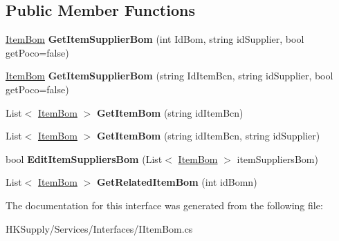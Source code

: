 \subsection*{Public Member Functions}
\begin{DoxyCompactItemize}
\item 
\mbox{\label{interface_h_k_supply_1_1_services_1_1_interfaces_1_1_i_item_bom_ab4f73cd313c20fa31a6ca6c4f2f8331a}} 
\mbox{\hyperlink{class_h_k_supply_1_1_models_1_1_item_bom}{Item\+Bom}} {\bfseries Get\+Item\+Supplier\+Bom} (int Id\+Bom, string id\+Supplier, bool get\+Poco=false)
\item 
\mbox{\label{interface_h_k_supply_1_1_services_1_1_interfaces_1_1_i_item_bom_a1568c6b62fe6356b70e99149376eb3f7}} 
\mbox{\hyperlink{class_h_k_supply_1_1_models_1_1_item_bom}{Item\+Bom}} {\bfseries Get\+Item\+Supplier\+Bom} (string Id\+Item\+Bcn, string id\+Supplier, bool get\+Poco=false)
\item 
\mbox{\label{interface_h_k_supply_1_1_services_1_1_interfaces_1_1_i_item_bom_a14c5bde641578f9e8b1ebad500093c84}} 
List$<$ \mbox{\hyperlink{class_h_k_supply_1_1_models_1_1_item_bom}{Item\+Bom}} $>$ {\bfseries Get\+Item\+Bom} (string id\+Item\+Bcn)
\item 
\mbox{\label{interface_h_k_supply_1_1_services_1_1_interfaces_1_1_i_item_bom_a9814e49dce27daa392533c07a25b8fe1}} 
List$<$ \mbox{\hyperlink{class_h_k_supply_1_1_models_1_1_item_bom}{Item\+Bom}} $>$ {\bfseries Get\+Item\+Bom} (string id\+Item\+Bcn, string id\+Supplier)
\item 
\mbox{\label{interface_h_k_supply_1_1_services_1_1_interfaces_1_1_i_item_bom_a2d4249a00371f575e85bbade36d4897a}} 
bool {\bfseries Edit\+Item\+Suppliers\+Bom} (List$<$ \mbox{\hyperlink{class_h_k_supply_1_1_models_1_1_item_bom}{Item\+Bom}} $>$ item\+Suppliers\+Bom)
\item 
\mbox{\label{interface_h_k_supply_1_1_services_1_1_interfaces_1_1_i_item_bom_aa3a75a076f313752949c7e4cb1b61ac1}} 
List$<$ \mbox{\hyperlink{class_h_k_supply_1_1_models_1_1_item_bom}{Item\+Bom}} $>$ {\bfseries Get\+Related\+Item\+Bom} (int id\+Bomn)
\end{DoxyCompactItemize}


The documentation for this interface was generated from the following file\+:\begin{DoxyCompactItemize}
\item 
H\+K\+Supply/\+Services/\+Interfaces/I\+Item\+Bom.\+cs\end{DoxyCompactItemize}
